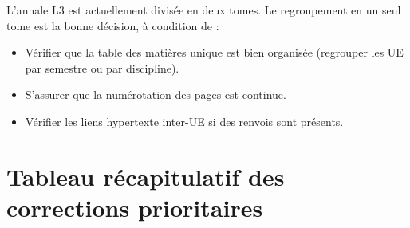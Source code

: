 \documentclass[12pt,a4paper]{article}
\begin{document}
L'annale L3 est actuellement divisée en deux tomes. Le regroupement en un seul tome est la bonne décision, à condition de :
\begin{itemize}
  \item Vérifier que la table des matières unique est bien organisée (regrouper les UE par semestre ou par discipline).
  \item S'assurer que la numérotation des pages est continue.
  \item Vérifier les liens hypertexte inter-UE si des renvois sont présents.
\end{itemize}

\section{Tableau récapitulatif des corrections prioritaires}
\end{document}
